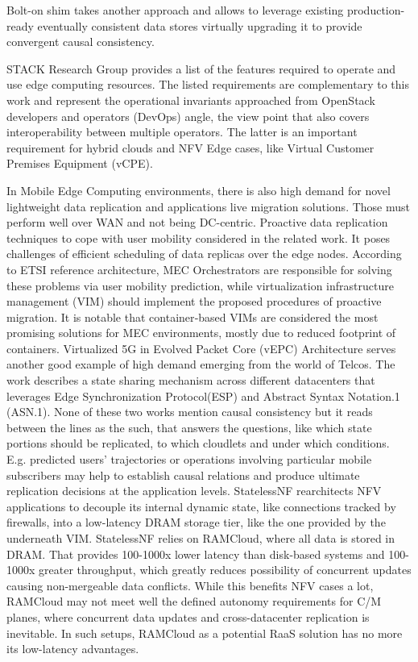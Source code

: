 \documentclass[conference]{IEEEtran}
\begin{document}
Bolt-on\cite{b13} shim takes another approach and allows to leverage existing
production-ready eventually consistent data stores virtually upgrading it to
provide convergent causal consistency.

STACK Research Group\cite{b8} provides a list of the features required to
operate and use edge computing resources. The listed requirements are
complementary to this work and represent the operational invariants approached
from OpenStack developers and operators (DevOps) angle, the view point that
also covers interoperability between multiple operators. The latter is an
important requirement for hybrid clouds and NFV Edge cases, like Virtual
Customer Premises Equipment (vCPE).

In Mobile Edge Computing environments, there is also high demand for novel
lightweight data replication and applications live migration solutions. Those
must perform well over WAN and not being DC-centric. Proactive data replication
techniques to cope with user mobility considered in the related work\cite{b14}.
It poses challenges of efficient scheduling of data replicas over the edge
nodes. According to ETSI reference architecture, MEC Orchestrators are
responsible for solving these problems via user mobility prediction, while
virtualization infrastructure management (VIM) should implement the proposed
procedures of proactive migration. It is notable that container‐based VIMs are
considered the most promising solutions for MEC environments, mostly due to
reduced footprint of containers. Virtualized 5G in Evolved Packet Core (vEPC)
Architecture\cite{b15} serves another good example of high demand emerging
from the world of Telcos. The work describes a state sharing mechanism across
different datacenters that leverages Edge Synchronization Protocol(ESP) and
Abstract Syntax Notation.1 (ASN.1). None of these two works mention
causal consistency but it reads between the lines as the such, that answers the
questions, like which state portions should be replicated, to which cloudlets
and under which conditions. E.g. predicted users' trajectories or operations
involving particular mobile subscribers may help to establish causal relations
and produce ultimate replication decisions at the application levels.
StatelessNF\cite{b16} rearchitects NFV applications to decouple its internal
dynamic state, like connections tracked by firewalls, into a low-latency DRAM
storage tier, like the one provided by the underneath VIM. StatelessNF relies on
RAMCloud\cite{b18}, where all data is stored in DRAM. That provides 100-1000x
lower latency than disk-based systems and 100-1000x greater throughput, which
greatly reduces possibility of concurrent updates causing non-mergeable data
conflicts. While this benefits NFV cases a lot, RAMCloud may not meet well the
defined autonomy requirements for C/M planes, where concurrent data updates and
cross-datacenter replication is inevitable. In such setups, RAMCloud as a
potential RaaS solution has no more its low-latency advantages.
\end{document}
